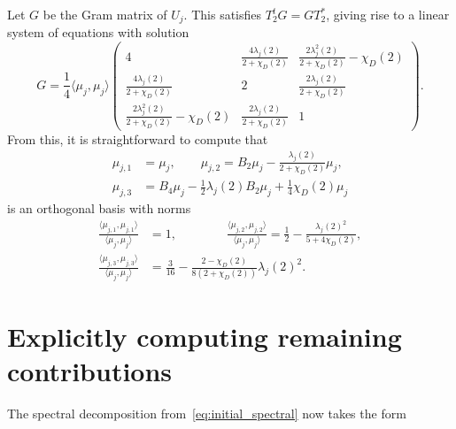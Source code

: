 \documentclass[11pt,reqno,oneside]{amsart}
\theoremstyle{plain}
\theoremstyle{definition}
\begin{document}
Let $G$ be the Gram matrix of $U_j$.
This satisfies $T_2^t G = G T_2^*$, giving rise to a linear system of equations
with solution
\[
  G = \frac{1}{4}\langle \mu_j, \mu_j \rangle \begin{pmatrix}
    4                                                  & \frac{4 \lambda_j(2)}{2 + \chi_D(2)} & \frac{2 \lambda_j^2(2)}{2 + \chi_D(2)} - \chi_D(2) \\
    \frac{4 \lambda_j(2)}{2 + \chi_D(2)}               & 2                                    & \frac{2 \lambda_j(2)}{2 + \chi_D(2)}               \\
    \frac{2 \lambda_j^2(2)}{2 + \chi_D(2)} - \chi_D(2) & \frac{2 \lambda_j(2)}{2 + \chi_D(2)} & 1
  \end{pmatrix}.
\]
From this, it is straightforward to compute that
\begin{equation}
  \begin{split}\label{eq:basis}
    \mu_{j,1} & = \mu_j, \qquad \mu_{j,2} = B_2 \mu_j - \frac{\lambda_j(2)}{2 +
    \chi_D(2)} \mu_j,                                                                            \\
    \mu_{j,3} & = B_4 \mu_j - \tfrac{1}{2} \lambda_j(2) B_2 \mu_j + \tfrac{1}{4} \chi_D(2) \mu_j
  \end{split}
\end{equation}
is an orthogonal basis with norms
\begin{equation}
  \begin{split}\label{eq:basis_norms}
    \frac{\langle  \mu_{j,1} , \mu_{j,1} \rangle}{\langle  \mu_j, \mu_j \rangle} & =
    1, \qquad \qquad
    \frac{\langle  \mu_{j,2}, \mu_{j,2} \rangle}{\langle  \mu_j, \mu_j \rangle} = \frac{1}{2} - \frac{\lambda_j(2)^2}{5+4\chi_D(2)},
    \\
    \frac{\langle  \mu_{j,3}, \mu_{j,3} \rangle}{\langle  \mu_j, \mu_j \rangle}  & = \frac{3}{16} - \frac{2 - \chi_D(2)}{8(2 + \chi_D(2))} \lambda_j(2)^2 .
  \end{split}
\end{equation}


\section{Explicitly computing remaining contributions}\label{sec:compute}

The spectral decomposition from~\eqref{eq:initial_spectral} now takes the form
\end{document}
